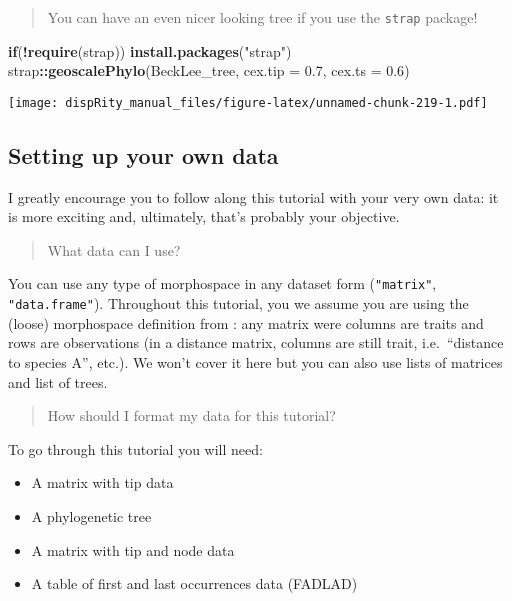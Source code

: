 \documentclass[
]{book}
\newenvironment{Shaded}{\begin{snugshade}}{\end{snugshade}}
\newcommand{\ControlFlowTok}[1]{\textcolor[rgb]{0.13,0.29,0.53}{\textbf{#1}}}
\newcommand{\DataTypeTok}[1]{\textcolor[rgb]{0.13,0.29,0.53}{#1}}
\newcommand{\FloatTok}[1]{\textcolor[rgb]{0.00,0.00,0.81}{#1}}
\newcommand{\KeywordTok}[1]{\textcolor[rgb]{0.13,0.29,0.53}{\textbf{#1}}}
\newcommand{\NormalTok}[1]{#1}
\newcommand{\OperatorTok}[1]{\textcolor[rgb]{0.81,0.36,0.00}{\textbf{#1}}}
\newcommand{\StringTok}[1]{\textcolor[rgb]{0.31,0.60,0.02}{#1}}
\providecommand{\tightlist}{%
  \setlength{\itemsep}{0pt}\setlength{\parskip}{0pt}}
\begin{document}
\begin{quote}
You can have an even nicer looking tree if you use the \texttt{strap} package!
\end{quote}

\begin{Shaded}
\begin{Highlighting}[]
\ControlFlowTok{if}\NormalTok{(}\OperatorTok{!}\KeywordTok{require}\NormalTok{(strap)) }\KeywordTok{install.packages}\NormalTok{(}\StringTok{"strap"}\NormalTok{)}
\NormalTok{strap}\OperatorTok{::}\KeywordTok{geoscalePhylo}\NormalTok{(BeckLee\_tree, }\DataTypeTok{cex.tip =} \FloatTok{0.7}\NormalTok{, }\DataTypeTok{cex.ts =} \FloatTok{0.6}\NormalTok{)}
\end{Highlighting}
\end{Shaded}

\texttt{[image: dispRity\_manual\_files/figure-latex/unnamed-chunk-219-1.pdf]}

\hypertarget{setting-up-your-own-data}{%
\subsection{Setting up your own data}\label{setting-up-your-own-data}}

I greatly encourage you to follow along this tutorial with your very own data: it is more exciting and, ultimately, that's probably your objective.

\begin{quote}
What data can I use?
\end{quote}

You can use any type of morphospace in any dataset form (\texttt{"matrix"}, \texttt{"data.frame"}). Throughout this tutorial, you we assume you are using the (loose) morphospace definition from \citet{Guillerme2020}: any matrix were columns are traits and rows are observations (in a distance matrix, columns are still trait, i.e.~``distance to species A'', etc.).
We won't cover it here but you can also use lists of matrices and list of trees.

\begin{quote}
How should I format my data for this tutorial?
\end{quote}

To go through this tutorial you will need:

\begin{itemize}
\tightlist
\item
  A matrix with tip data
\item
  A phylogenetic tree
\item
  A matrix with tip and node data
\item
  A table of first and last occurrences data (FADLAD)
\end{itemize}
\end{document}
